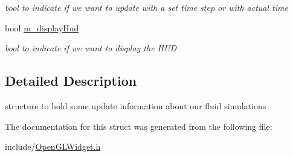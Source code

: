 \begin{DoxyCompactItemize}
\begin{DoxyCompactList}\small\item\em bool to indicate if we want to update with a set time step or with actual time \end{DoxyCompactList}\item 
\hypertarget{struct_open_g_l_widget_1_1fluid_sim_props_a466fa489adaefe2e54cc8ea3b1f64af8}{bool \hyperlink{struct_open_g_l_widget_1_1fluid_sim_props_a466fa489adaefe2e54cc8ea3b1f64af8}{m\-\_\-display\-Hud}}\label{struct_open_g_l_widget_1_1fluid_sim_props_a466fa489adaefe2e54cc8ea3b1f64af8}

\begin{DoxyCompactList}\small\item\em bool to indicate if we want to display the H\-U\-D \end{DoxyCompactList}\end{DoxyCompactItemize}


\subsection{Detailed Description}
structure to hold some update information about our fluid simulations 

The documentation for this struct was generated from the following file\-:\begin{DoxyCompactItemize}
\item 
include/\hyperlink{_open_g_l_widget_8h}{Open\-G\-L\-Widget.\-h}\end{DoxyCompactItemize}
